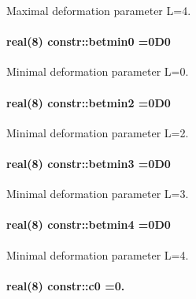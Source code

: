Maximal deformation parameter L=4. 

\paragraph[{\texorpdfstring{betmin0}{betmin0}}]{\setlength{\rightskip}{0pt plus 5cm}real(8) constr\+::betmin0 =0\+D0}\hypertarget{namespaceconstr_abe35529a6c8456a7cf906998a2aaedfb}{}\label{namespaceconstr_abe35529a6c8456a7cf906998a2aaedfb}


Minimal deformation parameter L=0. 

\paragraph[{\texorpdfstring{betmin2}{betmin2}}]{\setlength{\rightskip}{0pt plus 5cm}real(8) constr\+::betmin2 =0\+D0}\hypertarget{namespaceconstr_a36044d647f87781b963f69603cbf8d81}{}\label{namespaceconstr_a36044d647f87781b963f69603cbf8d81}


Minimal deformation parameter L=2. 

\paragraph[{\texorpdfstring{betmin3}{betmin3}}]{\setlength{\rightskip}{0pt plus 5cm}real(8) constr\+::betmin3 =0\+D0}\hypertarget{namespaceconstr_a06b6dd91134ff376e8cff0d3bc21d6e2}{}\label{namespaceconstr_a06b6dd91134ff376e8cff0d3bc21d6e2}


Minimal deformation parameter L=3. 

\paragraph[{\texorpdfstring{betmin4}{betmin4}}]{\setlength{\rightskip}{0pt plus 5cm}real(8) constr\+::betmin4 =0\+D0}\hypertarget{namespaceconstr_a31827347e570a426bd60373f2ef8c219}{}\label{namespaceconstr_a31827347e570a426bd60373f2ef8c219}


Minimal deformation parameter L=4. 

\paragraph[{\texorpdfstring{c0}{c0}}]{\setlength{\rightskip}{0pt plus 5cm}real(8) constr\+::c0 =0.}\hypertarget{namespaceconstr_acae195768a31542ac96a58b68d894253}{}\label{namespaceconstr_acae195768a31542ac96a58b68d894253}


